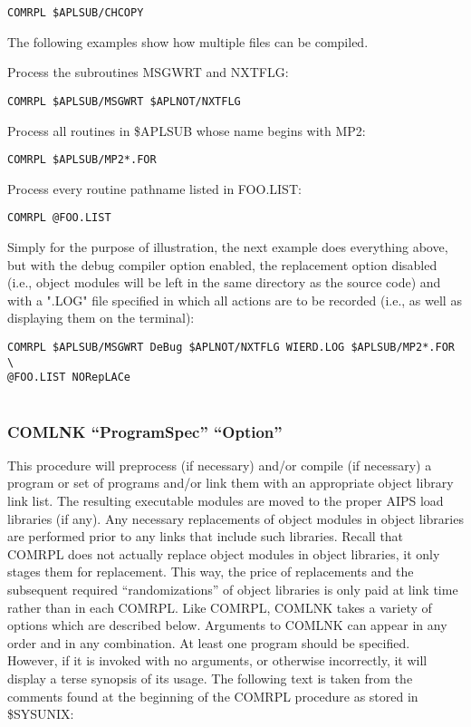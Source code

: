 \begin{verbatim}
COMRPL $APLSUB/CHCOPY

\end{verbatim}
The following examples show how multiple files can be compiled.

Process the subroutines MSGWRT and NXTFLG:

\begin{verbatim}
COMRPL $APLSUB/MSGWRT $APLNOT/NXTFLG

\end{verbatim}
Process all routines in \$APLSUB whose name begins with MP2:

\begin{verbatim}
COMRPL $APLSUB/MP2*.FOR

\end{verbatim}
Process every routine pathname listed in FOO.LIST:

\begin{verbatim}
COMRPL @FOO.LIST

\end{verbatim}
Simply for the purpose of illustration, the next example does
everything above, but with the debug compiler option enabled, the
replacement option disabled (i.e., object modules will be left in the
same directory as the source code) and with a ".LOG" file specified in
which all actions are to be recorded (i.e., as well as displaying them
on the terminal):

\begin{verbatim}
COMRPL $APLSUB/MSGWRT DeBug $APLNOT/NXTFLG WIERD.LOG $APLSUB/MP2*.FOR \
@FOO.LIST NORepLACe


\end{verbatim}

\subsubsection{COMLNK ``ProgramSpec'' ``Option''}
This procedure will preprocess (if necessary) and/or compile (if
necessary) a program or set of programs and/or link them with an
appropriate object library link list.  The resulting executable
modules are moved to the proper AIPS load libraries (if any). Any
necessary replacements of object modules in object libraries are
performed prior to any links that include such libraries.  Recall that
COMRPL does not actually replace object modules in object libraries,
it only stages them for replacement.  This way, the price of
replacements and the subsequent required ``randomizations'' of object
libraries is only paid at link time rather than in each COMRPL.  Like
COMRPL, COMLNK takes a variety of options which are described below.
Arguments to COMLNK can appear in any order and in any combination.
At least one program should be specified. However, if it is invoked
with no arguments, or otherwise incorrectly, it will display a terse
synopsis of its usage.  The following text is taken from the comments
found at the beginning of the COMRPL procedure as stored in \$SYSUNIX:

